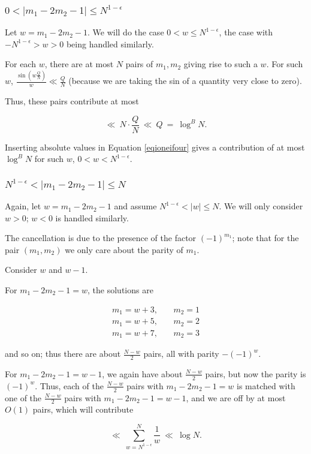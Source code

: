 \documentclass[12pt,letterpaper]{report}
\newcommand\be{\begin{equation}}
\newcommand\ee{\end{equation}}
\newcommand\bea{\begin{eqnarray}}
\newcommand\eea{\end{eqnarray}}
\begin{document}
\subsubsection{$0 < |m_1 - 2m_2 - 1| \le N^{1-\epsilon}$}

Let $w = m_1 - 2m_2 - 1$. We will do the case $0 < w \le
N^{1-\epsilon}$, the case with $-N^{1-\epsilon} > w > 0$ being
handled similarly.

For each $w$, there are at most $N$ pairs of $m_1, m_2$ giving
rise to such a $w$. For such $w$, $\frac{\sin( w \frac{Q}{N} )}{w}
\ll \frac{Q}{N}$ (because we are taking the sin of a quantity very
close to zero).

Thus, these pairs contribute at most

\be \ll \ N \cdot \frac{Q}{N} \ \ll \ Q \ = \ \log^B N. \ee

Inserting absolute values in Equation \ref{eqioneifour} gives a
contribution of at most $\log^B N$ for such $w$, $0 < w < N^{1 -
\epsilon}$.

\subsubsection{$N^{1-\epsilon} < |m_1 - 2m_2 - 1| \le N$}

Again, let $w = m_1 - 2m_2 - 1$ and assume $N^{1-\epsilon} < |w|
\le N$. We will only consider $w > 0$; $w < 0$ is handled
similarly.

The cancellation is due to the presence of the factor
$(-1)^{m_1}$; note that for the pair $(m_1,m_2)$ we only care
about the parity of $m_1$.

Consider $w$ and $w-1$.

For $m_1 - 2m_2 - 1 = w$, the solutions are

\bea m_1 = w + 3, & \ & m_2 = 1 \nonumber\\
m_1 = w + 5, & \ & m_2 = 2 \nonumber\\ m_1 = w + 7, & \ & m_2 = 3
\eea

and so on; thus there are about $\frac{N-w}{2}$ pairs, all with
parity $-(-1)^w$.

For $m_1 - 2m_2 - 1 = w - 1$, we again have about $\frac{N-w}{2}$
pairs, but now the parity is $(-1)^w$. Thus,  each of the
$\frac{N-w}{2}$ pairs with $m_1 - 2m_2 - 1 = w$ is matched with
one of the $\frac{N-w}{2}$ pairs with $m_1 - 2m_2 - 1 = w-1$, and
we are off by at most $O(1)$ pairs, which will contribute

\be \ll \ \sum_{w= N^{1-\epsilon}}^N \frac{1}{w} \ \ll \ \log N.
\ee
\end{document}
